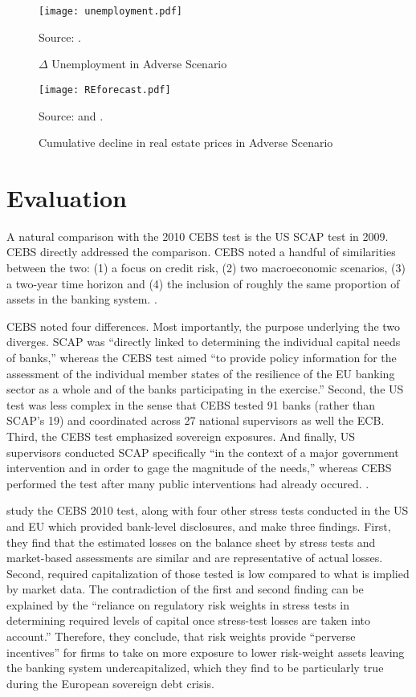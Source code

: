 \documentclass[12pt]{article}
\begin{document}
\setcounter{figure}{8}
\begin{figure}[h]
\caption{$\Delta$ Unemployment in Adverse Scenario}\label{unemployment}
\centering
\texttt{[image: unemployment.pdf]}

\raggedright
\footnotesize Source: \citet{Methodology}.
\end{figure}

\begin{figure}[h]
\caption{Cumulative decline in real estate prices in Adverse Scenario}\label{REforecast}
\centering
\texttt{[image: REforecast.pdf]}
\raggedright
\footnotesize Source: \citet{Methodology} and \citet{SCAPResults}.
\end{figure}

\section{Evaluation}

A natural comparison with the 2010 CEBS test is the US SCAP test in 2009. CEBS directly addressed the comparison. CEBS noted a handful of similarities between the two: (1) a focus on credit risk, (2) two macroeconomic scenarios, (3) a two-year time horizon and (4) the inclusion of roughly the same proportion of assets in the banking system. \citep{QA}.

CEBS noted four differences. Most importantly, the purpose underlying the two diverges. SCAP was ``directly linked to determining the individual capital needs of banks,'' whereas the CEBS test aimed ``to provide policy information for the assessment of the individual member states of the resilience of the EU banking sector as a whole and of the banks participating in the exercise.'' Second, the US test was less complex in the sense that CEBS tested 91 banks (rather than SCAP's 19) and coordinated across 27 national supervisors as well the ECB. Third, the CEBS test emphasized sovereign exposures. And finally, US supervisors conducted SCAP specifically ``in the context of a major government intervention and in order to gage the magnitude of the needs,'' whereas CEBS performed the test after many public interventions had already occured. \citep{QA}.

\citet{Engle} study the CEBS 2010 test, along with four other stress tests conducted in the US and EU which provided bank-level disclosures, and make three findings. First, they find that the estimated losses on the balance sheet by stress tests and market-based assessments are similar and are representative of actual losses. Second, required capitalization of those tested is low compared to what is implied by market data. The contradiction of the first and second finding can be explained by the ``reliance on regulatory risk weights in stress tests in determining required levels of capital once stress-test losses are taken into account.'' Therefore, they conclude, that risk weights provide ``perverse incentives'' for firms to take on more exposure to lower risk-weight assets leaving the banking system undercapitalized, which they find to be particularly true during the European sovereign debt crisis.
\end{document}
